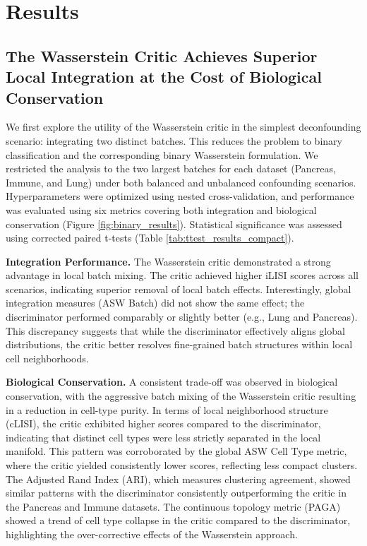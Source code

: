 \documentclass[unnumsec,webpdf,contemporary,large]{oup-authoring-template}%
\theoremstyle{thmstyleone}%
\theoremstyle{thmstyletwo}%
\theoremstyle{thmstylethree}%
\begin{document}
\section{Results}

\subsection{The Wasserstein Critic Achieves Superior Local Integration at the Cost of Biological Conservation}

We first explore the utility of the Wasserstein critic in the simplest deconfounding scenario: integrating two distinct batches. This reduces the problem to binary classification and the corresponding binary Wasserstein formulation. We restricted the analysis to the two largest batches for each dataset (Pancreas, Immune, and Lung) under both balanced and unbalanced confounding scenarios. Hyperparameters were optimized using nested cross-validation, and performance was evaluated using six metrics covering both integration and biological conservation (Figure \ref{fig:binary_results}). Statistical significance was assessed using corrected paired t-tests \citep{Nadeau2003-vp} (Table \ref{tab:ttest_results_compact}).

\textbf{Integration Performance.} The Wasserstein critic demonstrated a strong advantage in local batch mixing. The critic achieved higher iLISI scores across all scenarios, indicating superior removal of local batch effects. Interestingly, global integration measures (ASW Batch) did not show the same effect; the discriminator performed comparably or slightly better (e.g., Lung and Pancreas). This discrepancy suggests that while the discriminator effectively aligns global distributions, the critic better resolves fine-grained batch structures within local cell neighborhoods.

\textbf{Biological Conservation.} A consistent trade-off was observed in biological conservation, with the aggressive batch mixing of the Wasserstein critic resulting in a reduction in cell-type purity. In terms of local neighborhood structure (cLISI), the critic exhibited higher scores compared to the discriminator, indicating that distinct cell types were less strictly separated in the local manifold. This pattern was corroborated by the global ASW Cell Type metric, where the critic yielded consistently lower scores, reflecting less compact clusters. The Adjusted Rand Index (ARI), which measures clustering agreement, showed similar patterns with the discriminator consistently outperforming the critic in the Pancreas and Immune datasets. The continuous topology metric (PAGA) showed a trend of cell type collapse in the critic compared to the discriminator, highlighting the over-corrective effects of the Wasserstein approach.
\end{document}
